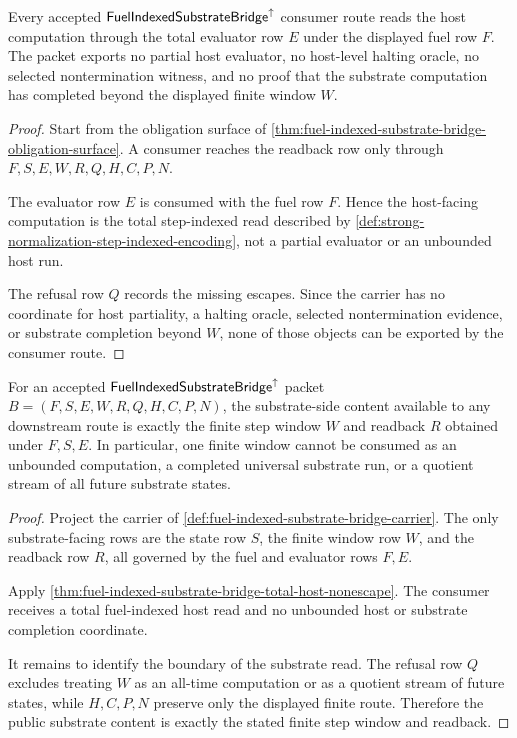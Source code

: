 \begin{theorem}
\label{thm:fuel-indexed-substrate-bridge-total-host-nonescape}
Every accepted $\mathsf{FuelIndexedSubstrateBridge}^{\uparrow}$ consumer route reads the host computation through the total evaluator row $E$ under the displayed fuel row $F$. The packet exports no partial host evaluator, no host-level halting oracle, no selected nontermination witness, and no proof that the substrate computation has completed beyond the displayed finite window $W$.
\end{theorem}
\begin{proof}
Start from the obligation surface of \autoref{thm:fuel-indexed-substrate-bridge-obligation-surface}. A consumer reaches the readback row only through $F,S,E,W,R,Q,H,C,P,N$.

The evaluator row $E$ is consumed with the fuel row $F$. Hence the host-facing computation is the total step-indexed read described by \autoref{def:strong-normalization-step-indexed-encoding}, not a partial evaluator or an unbounded host run.

The refusal row $Q$ records the missing escapes. Since the carrier has no coordinate for host partiality, a halting oracle, selected nontermination evidence, or substrate completion beyond $W$, none of those objects can be exported by the consumer route.
\end{proof}

\begin{theorem}
\label{thm:fuel-indexed-substrate-bridge-step-window-boundary}
For an accepted $\mathsf{FuelIndexedSubstrateBridge}^{\uparrow}$ packet $B=(F,S,E,W,R,Q,H,C,P,N)$, the substrate-side content available to any downstream route is exactly the finite step window $W$ and readback $R$ obtained under $F,S,E$. In particular, one finite window cannot be consumed as an unbounded computation, a completed universal substrate run, or a quotient stream of all future substrate states.
\end{theorem}
\begin{proof}
Project the carrier of \autoref{def:fuel-indexed-substrate-bridge-carrier}. The only substrate-facing rows are the state row $S$, the finite window row $W$, and the readback row $R$, all governed by the fuel and evaluator rows $F,E$.

Apply \autoref{thm:fuel-indexed-substrate-bridge-total-host-nonescape}. The consumer receives a total fuel-indexed host read and no unbounded host or substrate completion coordinate.

It remains to identify the boundary of the substrate read. The refusal row $Q$ excludes treating $W$ as an all-time computation or as a quotient stream of future states, while $H,C,P,N$ preserve only the displayed finite route. Therefore the public substrate content is exactly the stated finite step window and readback.
\end{proof}

